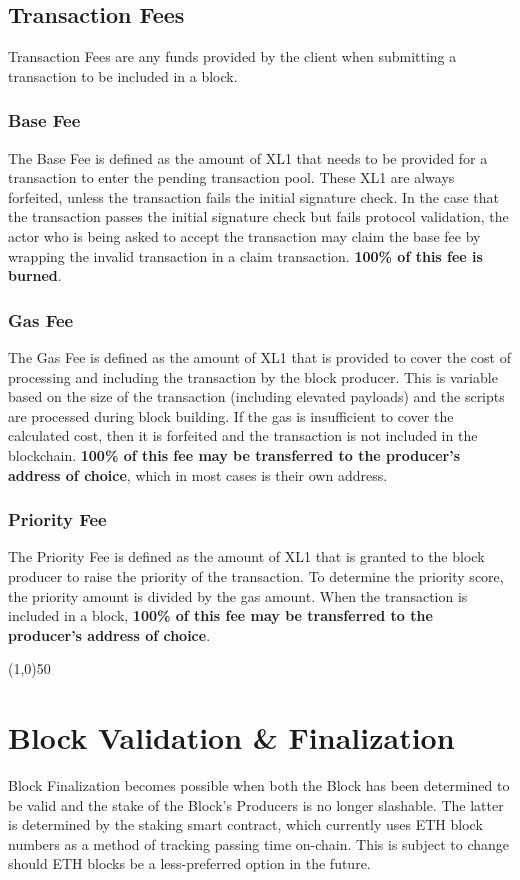 \documentclass{article}
\begin{document}
\subsection{Transaction Fees}
Transaction Fees are any funds provided by the client when submitting a transaction to be included in a block.

\subsubsection{Base Fee}
The Base Fee is defined as the amount of XL1 that needs to be provided for a transaction to enter the pending transaction pool. These XL1 are always forfeited, unless the transaction fails the initial signature check. In the case that the transaction passes the initial signature check but fails protocol validation, the actor who is being asked to accept the transaction may claim the base fee by wrapping the invalid transaction in a claim transaction. \textbf{100\% of this fee is burned}.

\subsubsection{Gas Fee}
The Gas Fee is defined as the amount of XL1 that is provided to cover the cost of processing and including the transaction by the block producer. This is variable based on the size of the transaction (including elevated payloads) and the scripts are processed during block building. If the gas is insufficient to cover the calculated cost, then it is forfeited and the transaction is not included in the blockchain. \textbf{100\% of this fee may be transferred to the producer's address of choice}, which in most cases is their own address. 


\subsubsection{Priority Fee}
The Priority Fee is defined as the amount of XL1 that is granted to the block producer to raise the priority of the transaction. To determine the priority score, the priority amount is divided by the gas amount. When the transaction is included in a block, \textbf{100\% of this fee may be transferred to the producer's address of choice}.

\begin{center}
\line(1,0){50}
\end{center}

\section{Block Validation \& Finalization}
Block Finalization becomes possible when both the Block has been determined to be valid and the stake of the Block's Producers is no longer slashable. The latter is determined by the staking smart contract, which currently uses ETH block numbers as a method of tracking passing time on-chain. This is subject to change should ETH blocks be a less-preferred option in the future.
\end{document}
